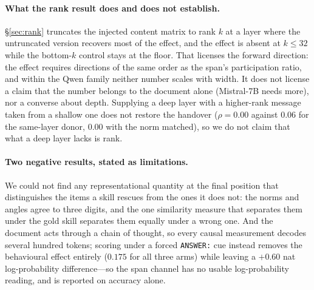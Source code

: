 \documentclass{article}
\begin{document}
\paragraph{What the rank result does and does not establish.}
\S\ref{sec:rank} truncates the injected content matrix to rank $k$ at a layer
where the untruncated version recovers most of the effect, and the effect is
absent at $k \le 32$ while the bottom-$k$ control stays at the floor. That
licenses the forward direction: the effect requires directions of the same order
as the span's participation ratio, and within the Qwen family neither number
scales with width. It does not license a claim that the number belongs to the
document alone (Mistral-7B needs more), nor a converse about depth. Supplying a deep layer
with a higher-rank message taken from a shallow one does not restore the
handover ($\rho=0.00$ against $0.06$ for the same-layer donor, $0.00$ with the
norm matched), so we do not claim that what a deep layer lacks is rank.

\paragraph{Two negative results, stated as limitations.} We could not find any
representational quantity at the final position that distinguishes the items a
skill rescues from the ones it does not: the norms and angles agree to three
digits, and the one similarity measure that separates them under the gold skill
separates them equally under a wrong one. And the document acts through a chain
of thought, so every causal measurement decodes several hundred tokens; scoring
under a forced \texttt{ANSWER:} cue instead removes the behavioural effect
entirely ($0.175$ for all three arms) while leaving a $+0.60$ nat
log-probability difference---so the span channel has no usable log-probability
reading, and is reported on accuracy alone.
\end{document}
